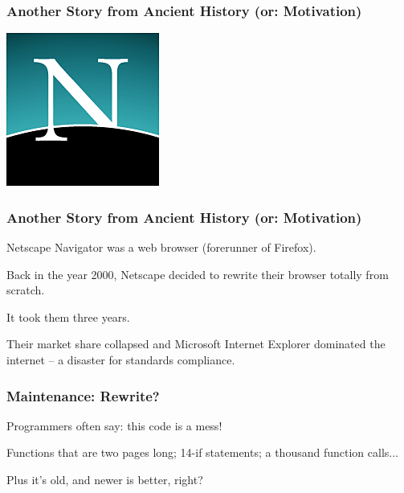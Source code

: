 \begin{frame}
\frametitle{Another Story from Ancient History (or: Motivation)}
\begin{changemargin}{1cm}

\begin{center}
\includegraphics{images/Netscape_classic_logo.png} 
\end{center}

\end{changemargin}
\end{frame}

\begin{frame}
\frametitle{Another Story from Ancient History (or: Motivation)}
\begin{changemargin}{1cm}

Netscape Navigator was a web browser (forerunner of Firefox).

Back in the year 2000, Netscape decided to rewrite their browser totally from scratch.

It took them three years.

Their market share collapsed and Microsoft Internet Explorer dominated the internet -- a disaster for standards compliance.

\end{changemargin}
\end{frame}

\begin{frame}
\frametitle{Maintenance: Rewrite?}
\begin{changemargin}{1cm}

Programmers often say: this code is a mess!

Functions that are two pages long; 14-if statements; a thousand function calls...

Plus it's old, and newer is better, right?

\end{changemargin}
\end{frame}


